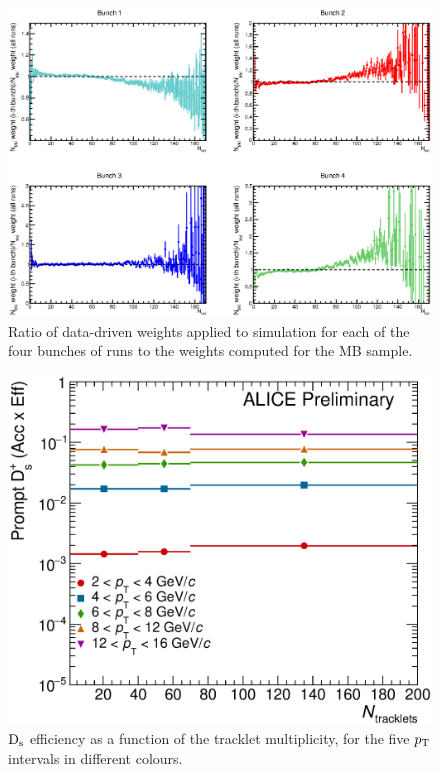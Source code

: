 \begin{figure}[h]
\centering
 \includegraphics[width=.9\textwidth]{FigCap6/NtrkDistrMC_17d2a_EvWithD_zVxtUnCorr_896_897.eps}
 \caption{Ratio of data-driven weights applied to simulation for each of the four bunches of runs to the weights computed for the MB sample.}
 \label{fig:RatioNtrklMC}
\end{figure}

\begin{figure}[h]
\centering
 \includegraphics[width=.5\textwidth]{FigCap6/PromptDsEfficiency_times_Acceptance_VsNtrkl.eps}
 \caption{${\rm D_s}$ efficiency as a function of the tracklet multiplicity, for the five $p_{\rm T}$ intervals in different colours.}
 \label{fig:DsEffVsMult}
\end{figure}




